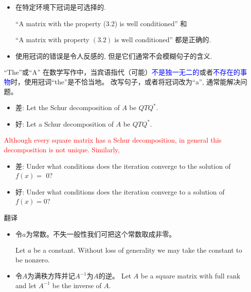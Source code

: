 \documentclass{ctexbeamer}
\newcommand{\red}[1]{\textcolor{red}{#1}}
\newcommand{\blue}[1]{\textcolor{blue}{#1}}
\begin{document}
\begin{frame}
\begin{itemize} 
	\item 在特定环境下冠词是可选择的. 

``A matrix with the property (3.2) is well conditioned'' 
和

 ``A matrix with property $(3.2)$ is well conditioned'' 
都是正确的.

 \item 使用冠词的错误是令人反感的, 但是它们通常不会模糊句子的含义.
\end{itemize}

\end{frame}


\begin{frame}{``The''或``A''}
在数学写作中，当宾语指代（可能）\blue{不是独一无二的}或者\blue{不存在的事物}时，使用冠词``the''是不恰当地。
改写句子，或者将冠词改为``a'', 通常能解决问题。
{
	
\begin{itemize}
\item 差: Let the Schur decomposition of $A$ be $Q T Q^{*}$. 
\item 好: Let a Schur decomposition of $A$ be $Q T Q^{*}$.
	\end{itemize}
}

\pause
\red{
Although every square matrix has a Schur decomposition, in general this decomposition is not unique.  Similarly, }


\begin{itemize}
\item 差: Under what conditions does the iteration converge to the solution of $f(x)=$ 
$0 ?$  \pause

\item  好: Under what conditions does the iteration converge to a solution of $f(x)=0 ?$
\end{itemize}
\end{frame}

\begin{frame}{翻译}
\begin{itemize}
\item 
    令$a$为常数。不失一般性我们可把这个常数取成非零。
\pause

Let $a$ be \alert{a} constant. Without loss of generality we may take \alert{the} constant to be nonzero.
\item 
    令$A$为满秩方阵并记$A^{-1}$为$A$的逆。
    \pause
Let $A$ be \alert{a} square matrix with full rank and let $A^{-1}$ be \alert{the} inverse of $A$.
\end{itemize}
\end{frame}
\end{document}
